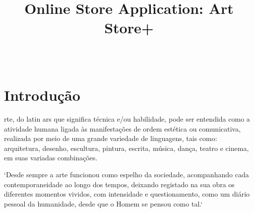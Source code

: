 \documentclass[conference]{IEEEtran}
\begin{document}
\title{Online Store Application: Art Store+}

\author{
\and
{}
\and
{}
}

\maketitle

\begin{abstract}
 \\
\end{abstract}

\begin{IEEEkeywords}

\end{IEEEkeywords}

\section{Introdução}

rte, do latin ars que significa técnica e/ou habilidade, pode ser entendida 
como a atividade humana ligada às manifestações de ordem estética ou comunicativa, realizada 
por meio de uma grande variedade de linguagens, tais como: arquitetura, desenho, escultura, 
pintura, escrita, música, dança, teatro e cinema, em suas variadas combinações. \cite{wikiarte}

`Desde sempre a arte funcionou como espelho da sociedade, 
acompanhando cada contemporaneidade ao longo dos tempos, deixando registado na sua obra os diferentes 
momentos vividos, com intensidade e questionamento, como um diário pessoal da humanidade, 
desde que o Homem se pensou como tal.` \cite{patrimonio}
\end{document}
